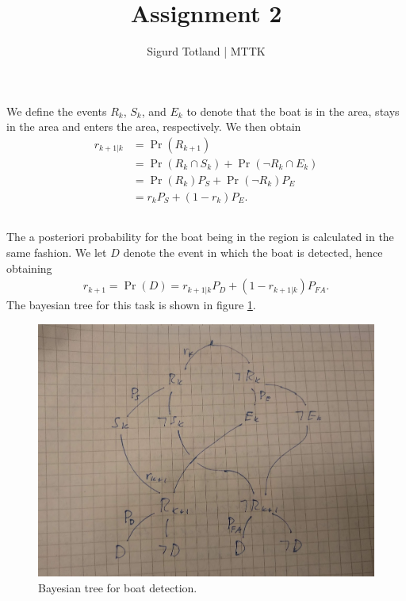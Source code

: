 \documentclass[]{article}
\title{Assignment 2}
\author{Sigurd Totland | MTTK}
\begin{document}
\maketitle

\section{}
\subsection{}
We define the events $R_k$, $S_k$, and $E_k$ to denote that the boat is in the area, stays in the area and enters the area, respectively. We then obtain
\begin{equation}\begin{aligned}
r_{k+1|k} &= \Pr(R_{k+1}) \\
&= \Pr(R_k \cap S_k) + \Pr(\neg R_k \cap E_k) \\
&= \Pr(R_k) P_S + \Pr(\neg R_k) P_E \\
&= r_k P_S + (1-r_k) P_E.
\end{aligned}\end{equation}

\subsection{}
The a posteriori probability for the boat being in the region is calculated in the same fashion. We let $D$ denote the event in which the boat is detected, hence obtaining
\begin{equation}\begin{aligned}
r_{k+1} = \Pr(D) = r_{k+1|k} P_D + (1-r_{k+1|k})P_{FA}.
\end{aligned}\end{equation}
The bayesian tree for this task is shown in figure \ref{fig:bayes_tree}.
\begin{figure}[H]
\centering
\includegraphics[width=0.6\columnwidth]{bayes.jpg}
\caption{Bayesian tree for boat detection.}
\label{fig:bayes_tree}
\end{figure}
\end{document}
